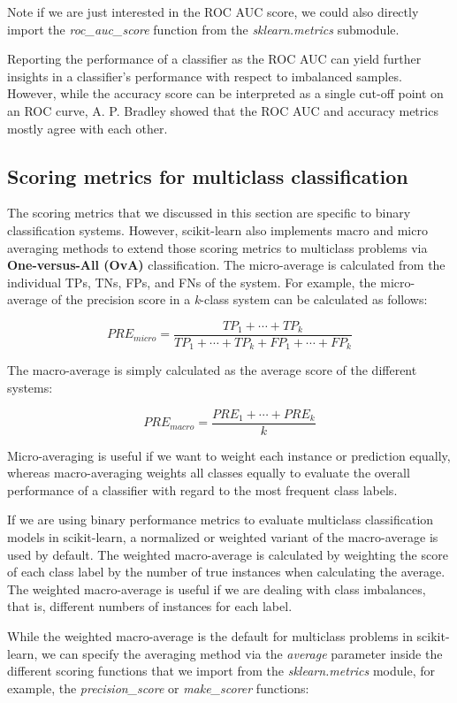 \documentclass[11pt]{article}
\begin{document}
Note if we are just interested in the ROC AUC score, we could also
directly import the \emph{roc\_auc\_score} function from the
\emph{sklearn.metrics} submodule.

Reporting the performance of a classifier as the ROC AUC can yield
further insights in a classifier's performance with respect to
imbalanced samples. However, while the accuracy score can be interpreted
as a single cut-off point on an ROC curve, A. P. Bradley showed that the
ROC AUC and accuracy metrics mostly agree with each other.

    \subsection{Scoring metrics for multiclass
classification}\label{scoring-metrics-for-multiclass-classification}

    The scoring metrics that we discussed in this section are specific to
binary classification systems. However, scikit-learn also implements
macro and micro averaging methods to extend those scoring metrics to
multiclass problems via \textbf{One-versus-All (OvA)} classification.
The micro-average is calculated from the individual TPs, TNs, FPs, and
FNs of the system. For example, the micro-average of the precision score
in a \emph{k}-class system can be calculated as follows:

\[PRE_{micro} = \frac{TP_1 + \cdots + TP_k}{TP_1 + \cdots + TP_k + FP_1 + \cdots + FP_k}\]

The macro-average is simply calculated as the average score of the
different systems:

\[PRE_{macro} = \frac{PRE_1 + \cdots + PRE_k}{k}\]

Micro-averaging is useful if we want to weight each instance or
prediction equally, whereas macro-averaging weights all classes equally
to evaluate the overall performance of a classifier with regard to the
most frequent class labels.

If we are using binary performance metrics to evaluate multiclass
classification models in scikit-learn, a normalized or weighted variant
of the macro-average is used by default. The weighted macro-average is
calculated by weighting the score of each class label by the number of
true instances when calculating the average. The weighted macro-average
is useful if we are dealing with class imbalances, that is, different
numbers of instances for each label.

While the weighted macro-average is the default for multiclass problems
in scikit-learn, we can specify the averaging method via the
\emph{average} parameter inside the different scoring functions that we
import from the \emph{sklearn.metrics} module, for example, the
\emph{precision\_score} or \emph{make\_scorer} functions:
\end{document}
